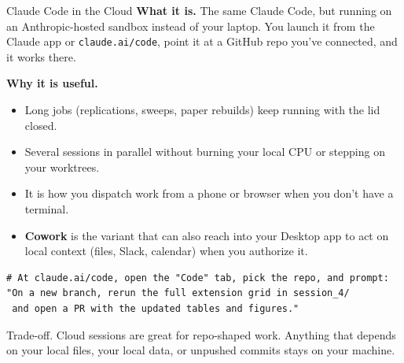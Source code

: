 \documentclass[aspectratio=169, 11pt]{beamer}
\begin{document}
\begin{frame}[fragile]{Claude Code in the Cloud}
  \textbf{What it is.} The same Claude Code, but running on an Anthropic-hosted sandbox instead of your laptop. You launch it from the Claude app or \texttt{claude.ai/code}, point it at a GitHub repo you've connected, and it works there.

  \vspace{0.4em}
  \textbf{Why it is useful.}
  \begin{itemize}\small
    \item Long jobs (replications, sweeps, paper rebuilds) keep running with the lid closed.
    \item Several sessions in parallel without burning your local CPU or stepping on your worktrees.
    \item It is how you dispatch work from a phone or browser when you don't have a terminal.
    \item \textbf{Cowork} is the variant that can also reach into your Desktop app to act on local context (files, Slack, calendar) when you authorize it.
  \end{itemize}

  \vspace{0.3em}
  \begin{lstlisting}[basicstyle=\ttfamily\footnotesize]
# At claude.ai/code, open the "Code" tab, pick the repo, and prompt:
"On a new branch, rerun the full extension grid in session_4/
 and open a PR with the updated tables and figures."
  \end{lstlisting}

  \vspace{0.2em}
  {\small \alert{Trade-off.} Cloud sessions are great for repo-shaped work. Anything that depends on your local files, your local data, or unpushed commits stays on your machine.}
\end{frame}
\end{document}
